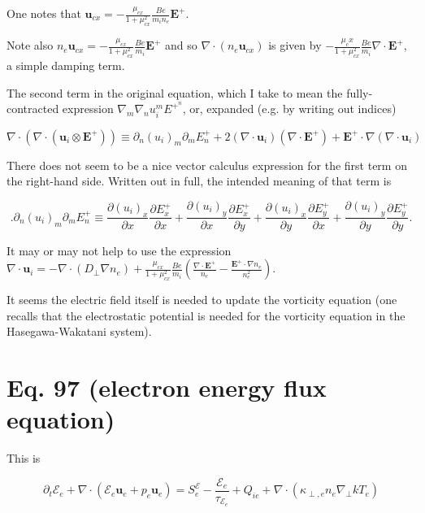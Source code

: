 \documentclass[11pt]{article}
\newcommand{\mbf}{\mathbf}
\begin{document}
One notes that $\mbf{u}_{cx} = -\frac{\mu_{cx}}{1+\mu_{cx}^2} \frac{B e}{m_i n_e} \mbf{E}^+$.

Note also $n_e \mbf{u}_{cx} = - \frac{\mu_{cx}}{1+\mu_{cx}^2} \frac{Be}{m_i} \mbf{E}^+$ and so $\nabla \cdot (n_e \mbf{u}_{cx})$ is given by $- \frac{\mu_cx}{1+\mu_{cx}^2} \frac{Be}{m_i} \nabla \cdot \mbf{E}^+$, a simple damping term.

The second term in the original equation, which I take to mean the fully-contracted expression $\nabla_m \nabla_n u_i^m E^+^n$, or, expanded (e.g. by writing out indices)

\begin{equation}
\nabla \cdot ( \nabla \cdot ( \mbf{u}_i \otimes \mbf{E}^+ )) \equiv \partial_n (u_i)_m \partial_m E^+_n + 2 (\nabla \cdot \mbf{u}_i) (\nabla \cdot \mbf{E}^+) + \mbf{E}^+ \cdot \nabla (\nabla \cdot \mbf{u}_i)
\end{equation}

There does not seem to be a nice vector calculus expression for the first term on the right-hand side.  Written out in full, the intended meaning of that term is

\begin{equation}
.\partial_n (u_i)_m \partial_m E^+_n \equiv \frac{\partial (u_i)_x}{\partial x} \frac{\partial E^+_x}{\partial x}+ \frac{\partial (u_i)_y}{\partial x} \frac{\partial E^+_x}{\partial y} + \frac{\partial (u_i)_x}{\partial y} \frac{\partial E^+_y}{\partial x}+\frac{\partial (u_i)_y}{\partial y} \frac{\partial E^+_y}{\partial y}.
\end{equation}

It may or may not help to use the expression $\nabla \cdot \mbf{u}_i = - \nabla \cdot (D_{\perp} \nabla n_e) + \frac{\mu_{cx}}{1+\mu_{cx}^2} \frac{Be}{m_i} \left ( \frac{\nabla \cdot \mbf{E}^+}{n_e} - \frac{\mbf{E}^+ \cdot \nabla n_e}{n_e^2} \right )$.

It seems the electric field itself is needed to update the vorticity equation (one recalls that the electrostatic potential is needed for the vorticity equation in the Hasegawa-Wakatani system).

\section{Eq. 97 (electron energy flux equation)}

This is 

\begin{equation}
\partial_t \mathcal{E}_e+\nabla \cdot (\mathcal{E}_e \mbf{u}_e+ p_e \mbf{u}_e) = S_e^{\mathcal{E}}-\frac{\mathcal{E}_e}{\tau_{\mathcal{E}_e}}+Q_{ie}+\nabla \cdot(\kappa_{\perp,e} n_e \nabla_{\perp} k T_e)
\end{equation}
\end{document}
